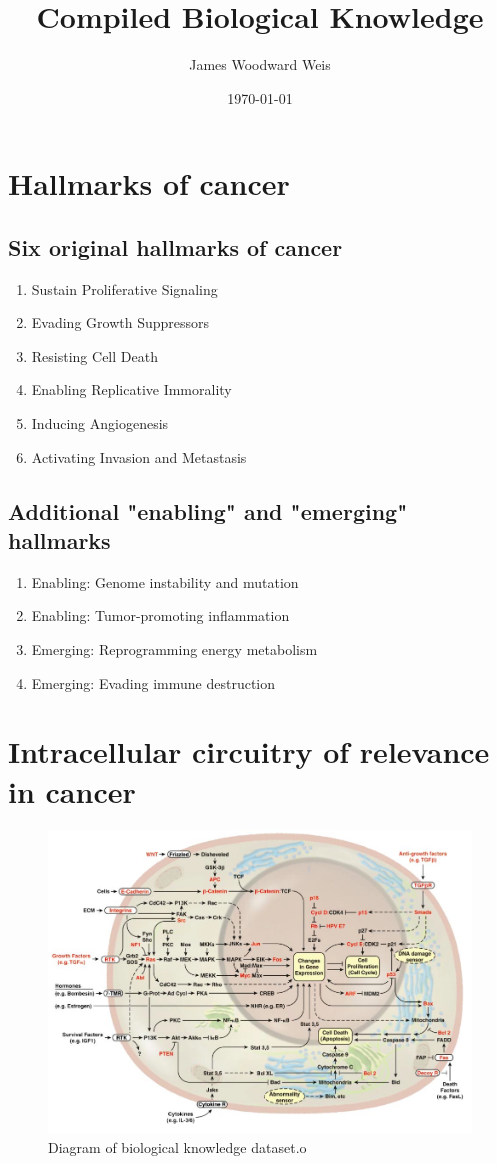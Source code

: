 \documentclass[11pt]{article}
\author{James Woodward Weis}
\date{\today}
\title{Compiled Biological Knowledge}
\begin{document}
\maketitle
\tableofcontents


\section{Hallmarks of cancer}
\label{sec-1}

\subsection{Six original hallmarks of cancer}
\label{sec-1-1}
\begin{enumerate}
\item Sustain Proliferative Signaling
\item Evading Growth Suppressors
\item Resisting Cell Death
\item Enabling Replicative Immorality
\item Inducing Angiogenesis
\item Activating Invasion and Metastasis
\end{enumerate}
\subsection{Additional "enabling" and "emerging" hallmarks}
\label{sec-1-2}
\begin{enumerate}
\item Enabling: Genome instability and mutation
\item Enabling: Tumor-promoting inflammation
\item Emerging: Reprogramming energy metabolism
\item Emerging: Evading immune destruction
\end{enumerate}
\section{Intracellular circuitry of relevance in cancer}
\label{sec-2}
\begin{figure}[htb]
\centering
\includegraphics[width=.9\linewidth]{./BIO-KNOWLEDGE-DIAGRAM.png}
\caption{Diagram of biological knowledge dataset.o}
\end{figure}
\end{document}
